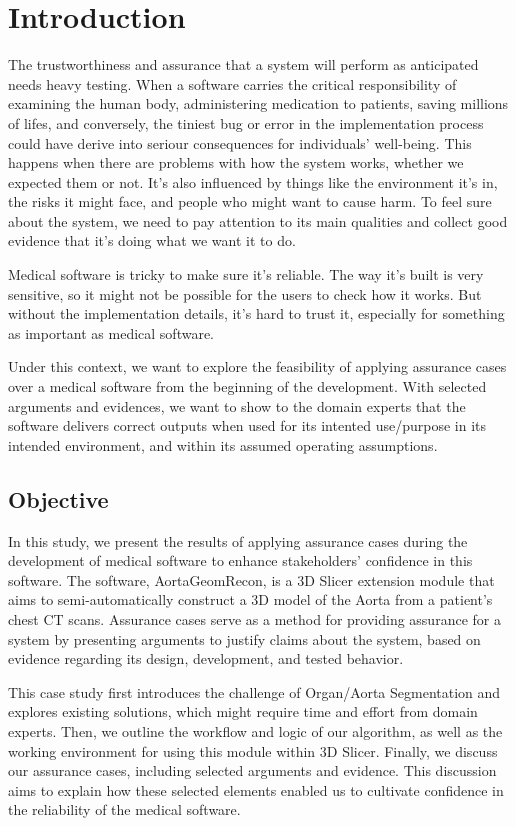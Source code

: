 \chapter{Introduction} \label{intro}
The trustworthiness and assurance that a system will perform as anticipated needs heavy testing. When a software carries the critical responsibility of examining the human body, administering medication to patients, saving millions of lifes, and conversely, the tiniest bug or error in the implementation process could have derive into seriour consequences for individuals' well-being. This happens when there are problems with how the system works, whether we expected them or not. It's also influenced by things like the environment it's in, the risks it might face, and people who might want to cause harm. To feel sure about the system, we need to pay attention to its main qualities and collect good evidence that it's doing what we want it to do.

Medical software is tricky to make sure it's reliable. The way it's built is very sensitive, so it might not be possible for the users to check how it works. But without the implementation details, it's hard to trust it, especially for something as important as medical software.

Under this context, we want to explore the feasibility of applying assurance cases over a medical software from the beginning of the development. With selected arguments and evidences, we want to show to the domain experts that the software delivers correct outputs when used for its intented use/purpose in its intended environment, and within its assumed operating assumptions.

\section{Objective} \label{obj}
In this study, we present the results of applying assurance cases during the development of medical software to enhance stakeholders' confidence in this software. The software, AortaGeomRecon, is a 3D Slicer extension module that aims to semi-automatically construct a 3D model of the Aorta from a patient's chest CT scans. Assurance cases serve as a method for providing assurance for a system by presenting arguments to justify claims about the system, based on evidence regarding its design, development, and tested behavior.

This case study first introduces the challenge of Organ/Aorta Segmentation and explores existing solutions, which might require time and effort from domain experts. Then, we outline the workflow and logic of our algorithm, as well as the working environment for using this module within 3D Slicer. Finally, we discuss our assurance cases, including selected arguments and evidence. This discussion aims to explain how these selected elements enabled us to cultivate confidence in the reliability of the medical software.

